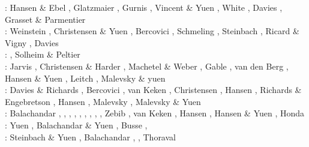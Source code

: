 \begin{scriptsize}
\nineteeneightyeight: Hansen \& Ebel \cite{haeb88}, Glatzmaier \cite{glat88}, 
                      Gurnis \cite{gurn88}, Vincent \& Yuen \cite{viyu88},
                      White \cite{whit88}, Davies \cite{davi88},
                      Grasset \& Parmentier \cite{grpa98}  \\ 
\nineteeneightynine: Weinstein \etal \cite{weoy89}, Christensen \& Yuen \cite{chyu89},
                     Bercovici \etal \cite{besg89}, Schmeling \cite{schm89},
                     Steinbach \etal \cite{sthe89}, Ricard \& Vigny \cite{rivi89},
                     Davies \cite{davi89}\\
\nineteenninety: \cite{trab90}\cite{gurn90}\cite{ketu90}, Solheim \& Peltier \cite{sope90}\\
\nineteenninetyone: Jarvis \cite{jarv91}, Christensen \& Harder \cite{chha91},
                    Machetel \& Weber \cite{mawe91}, Gable \etal \cite{gaot91},
                    van den Berg \etal \cite{vayv91}, Hansen \& Yuen \cite{hayk91},
                    Leitch \etal \cite{leys91} , Malevsky \& yuen \cite{mayu91}\\
\nineteenninetytwo: Davies \& Richards \cite{dari92}, Bercovici \etal \cite{besg92},
                    van Keken \etal{} \cite{vayv92},
                    Christensen \cite{chri92}, Hansen \etal \cite{haym92}, 
                    Richards \& Engebretson \cite{rien92}, Hansen \etal \cite{hayk92},
                    Malevsky \etal \cite{mayw92}, Malevsky \& Yuen \cite{mayu92} \\
\nineteenninetythree: Balachandar \etal \cite{bayr93}, \cite{zhch93},
                      \cite{jarv93}, \cite{tack93},
                       \cite{carm93},
                      \cite{vavy93}, \cite{tasg93},
                      \cite{zhgu93}, \cite{mamc93},
                      Zebib \cite{zebi93}, van Keken \etal \cite{vayv93}, 
                      Hansen \etal \cite{hayk93}, Hansen \& Yuen \cite{hayu93},
                      Honda \etal \cite{hoyb93,hoby93}\\
\nineteenninetyfour: Yuen \etal \cite{yurb94}, Balachandar \& Yuen \cite{bayu94}, \cite{haeb94}
                     Busse \etal \cite{bucc94},
                     \cite{chho94}\cite{tasg94}\cite{itki94}\cite{leka94}\cite{scha94}\\
\nineteenninetyfive: Steinbach \& Yuen \cite{styu95}, Balachandar \etal \cite{bayr95,bayr95b}, 
                     \cite{zhgu95}
                     \cite{vayv95}\cite{buba95}\cite{rasz95}\cite{berc95}\cite{puhj95}\cite{pujh95}
      \cite{solo95}\cite{vayu95}\cite{matb95}, Thoraval \etal \cite{thmc95}\\

\end{scriptsize}
